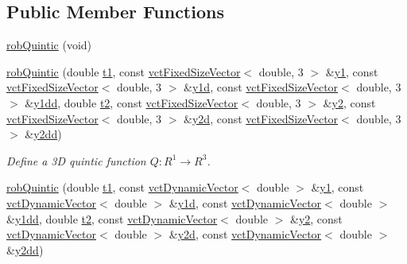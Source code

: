 \subsection*{Public Member Functions}
\begin{DoxyCompactItemize}
\item 
\hyperlink{classrob_quintic_a365fcae26cb823aabc52a8d55ef3e35f}{rob\-Quintic} (void)
\item 
\hyperlink{classrob_quintic_a6930cf8723c0f010ae52b0874655ec8f}{rob\-Quintic} (double \hyperlink{classrob_function_a9a4b408a3a5a8ae927caec3b6bac36ef}{t1}, const \hyperlink{classvct_fixed_size_vector}{vct\-Fixed\-Size\-Vector}$<$ double, 3 $>$ \&\hyperlink{classrob_function_rn_aadf26230a697fedca000dac29ae27129}{y1}, const \hyperlink{classvct_fixed_size_vector}{vct\-Fixed\-Size\-Vector}$<$ double, 3 $>$ \&\hyperlink{classrob_function_rn_a0cd776a1eec33965d8cdce69c7c12902}{y1d}, const \hyperlink{classvct_fixed_size_vector}{vct\-Fixed\-Size\-Vector}$<$ double, 3 $>$ \&\hyperlink{classrob_function_rn_a44e2cfac47df0d9324c0d7d6251d680f}{y1dd}, double \hyperlink{classrob_function_abf15c2d695ab4cc6336e19862327858f}{t2}, const \hyperlink{classvct_fixed_size_vector}{vct\-Fixed\-Size\-Vector}$<$ double, 3 $>$ \&\hyperlink{classrob_function_rn_a982a35e7e6f235da34765d3ceeb91109}{y2}, const \hyperlink{classvct_fixed_size_vector}{vct\-Fixed\-Size\-Vector}$<$ double, 3 $>$ \&\hyperlink{classrob_function_rn_a99d86533626d78aa644816936ec01ac2}{y2d}, const \hyperlink{classvct_fixed_size_vector}{vct\-Fixed\-Size\-Vector}$<$ double, 3 $>$ \&\hyperlink{classrob_function_rn_af67e2c772c0550231dd2b768adbae702}{y2dd})
\begin{DoxyCompactList}\small\item\em Define a 3\-D quintic function $Q: R^1\rightarrow R^3 $. \end{DoxyCompactList}\item 
\hyperlink{classrob_quintic_ad93d9a12bde9bfe35d48afb86c41980d}{rob\-Quintic} (double \hyperlink{classrob_function_a9a4b408a3a5a8ae927caec3b6bac36ef}{t1}, const \hyperlink{classvct_dynamic_vector}{vct\-Dynamic\-Vector}$<$ double $>$ \&\hyperlink{classrob_function_rn_aadf26230a697fedca000dac29ae27129}{y1}, const \hyperlink{classvct_dynamic_vector}{vct\-Dynamic\-Vector}$<$ double $>$ \&\hyperlink{classrob_function_rn_a0cd776a1eec33965d8cdce69c7c12902}{y1d}, const \hyperlink{classvct_dynamic_vector}{vct\-Dynamic\-Vector}$<$ double $>$ \&\hyperlink{classrob_function_rn_a44e2cfac47df0d9324c0d7d6251d680f}{y1dd}, double \hyperlink{classrob_function_abf15c2d695ab4cc6336e19862327858f}{t2}, const \hyperlink{classvct_dynamic_vector}{vct\-Dynamic\-Vector}$<$ double $>$ \&\hyperlink{classrob_function_rn_a982a35e7e6f235da34765d3ceeb91109}{y2}, const \hyperlink{classvct_dynamic_vector}{vct\-Dynamic\-Vector}$<$ double $>$ \&\hyperlink{classrob_function_rn_a99d86533626d78aa644816936ec01ac2}{y2d}, const \hyperlink{classvct_dynamic_vector}{vct\-Dynamic\-Vector}$<$ double $>$ \&\hyperlink{classrob_function_rn_af67e2c772c0550231dd2b768adbae702}{y2dd})

\end{DoxyCompactItemize}
